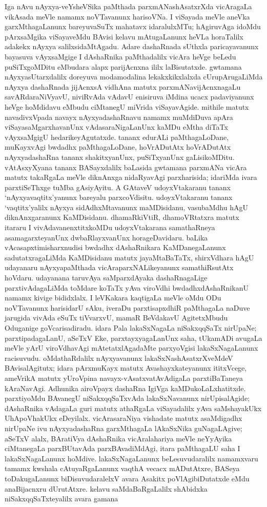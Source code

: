 Iga nAvu nAyxya-veYsheVSika paMthada parxmANashAsatxrXda vicAragaLa vikAsada meVle namamx noVTavanunx harisoVNa. I viSayada meVle aneVka garxMthagaLanunx bareyuvaSuTx mahatavx idaralulxMTu; hAgiruvAga idoMdu pArxsaMgika viSaya\-veMdu BAvisi kelavu mAtugaLanunx heVLa horaTalilx adakekx nAyxya salilxsi\-daMtAgadu. Adare dashaRnada sUthxla paricayavanunx bayasuva vAyxsaMgige I dAshaRnika paMtha\-dalilx vicAra heVge beLedu puSiTxgoMDitu eMbudara alapx parijAcnxna ililx laBisutatxde. gwtamana nAyxyasUtarxdalilx doreyuva modamodalina lekakxkikxlalxda cUrupAru\-gaLiMda nAyxya dashaRnada jijAcnxsA vidhAna matutx parxmANavijAcnxnagaLu savAR\-dara\-NiVyavU, niviRvAda vAdavU enisiruva iMdina ucacx padaviyanunx heVge hoMdi\-davu eMbudu ciMtanegU miVrida viSayavAgide. mithile matutx nava\-divxVpada navayx nAyxyadashaRnavu namamx muMdiDuva apAra viSayasaMgarxhavanUnx vAdasaraNigaLanUnx kaMDu eMtha diTaTx vAyxsaMgigU hedarikeyAgutatxde. tananx edu\-rALi paMthagaLoDane, muKayxvAgi bwdadhx paMthagaLoDane, hoVrA\-DutAtx hoVrA\-DutAtx nAyxyadashaRna tananx shakitxyanUnx, puSiTxyanUnx gaLisikoMDitu. vAtAsxyXyana tananx BASayxdalilx baLasida gwtamana parxmANa vicAra matutx takaRgaLa meVle diknAnxga nidaRyavAgi parxharisida; idariMda ivara parxtiSeThxge tuMba gAsi\-yAyitu. A GAtaveV udoyxVtakaranu tananx `nAyxyavaqtitx'yanunx bareyalu parxcoVdisitu. udoyxVtakaranu tananx `vaqtitx'yalilx nAyxya sidAdhxMtavanunx maMDisidanu, vasubaMdhu hAgU diknAnxgaranunx KaMDisidanu. dhamaRkiVtiR, dhamoVRtatxra matutx itararu I vivAdavanenxtitxkoMDu udoyxVtakarana samathaRneya asamagarxteyanUnx dwbaRlayx\-vanUnx horageDavidaru. baLika vAcasapxtimisharxnudisi bwdadhx dAshaRnikara KaMDane\-gaLanunx sadutatxragaLiMda KaMDisidanu matutx jayaMtaBaTaTx, shirxVdhara hAgU udayanaru nAyxyapaMthada vicAraparxNALikeyanunx samathiRsutAtx hoVdaru. udayanana taruvAya saMparxdAyaka dashaRnagaLige parxtivAdagaLiMda toMdare koTaTx yAva viroVdhi bwdadhxdAshaRnikanU namamx kivige bididxlalx. I leVKakara kaqtigaLa meVle oMdu ODu noVTavanunx harisidarU sAku, iveraDu parxtisapxdhiR paMthagaLa naDuve jarugida vivAda eSuTx tiVvarxvU, mamaR BeVdakavU AgitetxMbudu Oduganige goVcarisadiradu. idara Pala lakaSxNagaLa niSakxqqSaTx nirUpaNe; parxtipadagaLanU, aSeTxV Eke, parxtayxyagaLanUnx saha, tUkamADi avugaLa meVle yArU viroVdhavAgi mAtetatxlAgadaMte parxyoVgisi lakaSxNagaLanunx racisuvudu. oMdathaRdalilx nAyxyavanunx lakaSxNashAsatxrXveMdeV BAvisalAgitutx; idara pArxmuKayx matutx Avashayxkateyanunx ititxVcege, ameVrikA matutx yUroVpina navayx-vAsatxvatAvAdigaLa parxtiBaTaneya kAraNavAgi. Adhunika airoVpayx dashaRna IgiVga kaMDukoLaLxhatitxde. parxtiyoMdu BAvanegU niSakxqqSaTxvAda lakaSxNavanunx nirUpisalAgide; dAshaRnika vAdagaLa guri matutx athaRgaLa viSayadalilx yAva saMshayakUkx UhApoVhakUkx eDeyilalx. vicArasaraNiya vishadate matutx asaMdigadhx nirUpaNe ivu nAyxyadashaRna garxMthagaLa lAkaSxNika guNagaLAgive; aSeTxV alalx, BAratiVya dAshaRnika vicAralahariya meVle neYyAyika ciMtanegaLa parxBUtavAda parxBAvadiMdAgi, itara paMthagaLU saha I lakaSxNagaLanunx hoMdive. lakaSxNagaLanunx beLesuvudaralilx namamxvaru tamamx kwshala cAtuyaRgaLanunx vaqthA vecacx mADutAtxre, BASeya toDakugaLanunx biDisuvudaralelxV avara Asakitx poVlAgibiDutatxde eMdu anaBijacnxru dUrutAtxre. kelavu saMdaBaRgaLalilx shAbidxka niSakxqqSaTxteyalilx avara gamana 